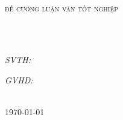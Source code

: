 \begin{titlepage}
\begin{center}
{\scshape\LARGE \univname\par}
\vspace{0.5cm}
{\scshape\LARGE \facname\par}
\vspace{1.0cm} %
\\
\vspace{1.0cm}
\textsc{\Large đề cương luận văn tốt nghiệp}\\[0.5cm] %

\HRule \\[0.4cm] %
{\huge \bfseries \ttitle\par}\vspace{0.4cm} %
\HRule \\[1.5cm] %
 
\begin{minipage}[t]{0.4\textwidth}
\begin{flushleft} \large
\emph{SVTH:}\\
\authorname 
\end{flushleft}
\end{minipage}
\begin{minipage}[t]{0.45\textwidth}
\begin{flushright} \large
\emph{GVHD:} \\
\supname
\end{flushright}
\end{minipage}\\[1cm]
 
{\large \today} %

\end{center}
\end{titlepage}